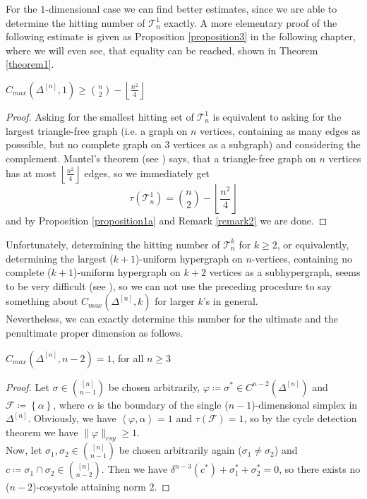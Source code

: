 For the \(1\)-dimensional case we can find better estimates, since we are able to determine the hitting number of \(\mathcal{T}_n^1\) exactly. A more elementary proof of the following estimate is given as Proposition \ref{proposition3} in the following chapter, where we will even see, that equality can be reached, shown in Theorem \ref{theorem1}.

\begin{prop}\label{proposition112}
\(C_{max}(\Delta^{[n]},1)\geq\binom{n}{2}-\left\lfloor\frac{n^2}{4}\right\rfloor\)
\begin{proof}
Asking for the smallest hitting set of \(\mathcal{T}_n^1\) is equivalent to asking for the largest triangle-free graph (i.e. a graph on \(n\) vertices, containing as many edges as posssible, but no complete graph on \(3\) vertices as a subgraph) and considering the complement. Mantel's theorem (see \cite{7}) says, that a triangle-free graph on \(n\) vertices has at most \(\left\lfloor\frac{n^2}{4}\right\rfloor\) edges, so we immediately get
\[
\tau(\mathcal{T}_n^1)=\binom{n}{2}-\left\lfloor\frac{n^2}{4}\right\rfloor
\]
and by Proposition \ref{proposition1a} and Remark \ref{remark2} we are done.
\end{proof}
\end{prop}

Unfortunately, determining the hitting number of \(\mathcal{T}_n^k\) for \(k\geq 2\), or equivalently, determining the largest (\(k+1\))-uniform hypergraph on \(n\)-vertices, containing no complete (\(k+1\))-uniform hypergraph on \(k+2\) vertices as a subhypergraph, seems to be very difficult (see \cite{7}), so we can not use the preceding procedure to say something about \(C_{max}(\Delta^{[n]},k)\) for larger \(k\)'s in general.\\
Nevertheless, we can exactly determine this number for the ultimate and the penultimate proper dimension as follows.

\begin{thm}\label{theorem7}
\(C_{max}(\Delta^{[n]},n-2)=1\), for all \(n\geq 3\)
\begin{proof}
Let \(\sigma\in\binom{[n]}{n-1}\) be chosen arbitrarily, \(\varphi\coloneqq \sigma^*\in C^{n-2}(\Delta^{[n]})\) and\\
\(\mathcal{F}\coloneqq \left\{\alpha\right\}\), where \(\alpha\) is the boundary of the single (\(n-1\))-dimensional simplex in \(\Delta^{[n]}\). Obviously, we have \(\left\langle\varphi,\alpha\right\rangle=1\) and \(\tau(\mathcal{F})=1\), so by the cycle detection theorem we have \(\|\varphi\|_{csy}\geq 1\).\\
Now, let \(\sigma_1,\sigma_2\in\binom{[n]}{n-1}\) be chosen arbitrarily again (\(\sigma_1\neq\sigma_2\)) and \(c\coloneqq \sigma_1\cap\sigma_2\in\binom{[n]}{n-2}\). Then we have \(\delta^{n-3}(c^*)+\sigma_1^*+\sigma_2^*=0\), so there exists no (\(n-2\))-cosystole attaining norm \(2\).
\end{proof}
\end{thm}

